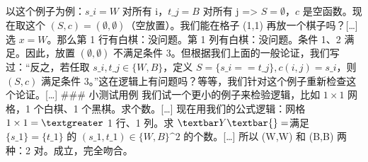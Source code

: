 以这个例子为例：$s\_i=W$ 对所有 i，$t\_j=B$ 对所有 j =\textgreater{} $S=\emptyset$，$c$ 是空函数。现在取这个 $(S,c)=(\emptyset, \emptyset)$（空放置）。我们能在格子 (1,1) 再放一个棋子吗？{[}\ldots{]} 选 $x=W$。那么第 1 行有白棋：没问题。第 1 列有白棋：没问题。条件 1、2 满足。因此，放置 $(\emptyset, \emptyset)$ 不满足条件 3。但根据我们上面的一般论证，我们写过：``反之，若任取 $s\_i,t\_j \in \{W,B\}$，定义 $S=\{s\_i==t\_j\}, c(i,j)=s\_i$，则 $(S,c)$ 满足条件 3。''这在逻辑上有问题吗？等等，我们针对这个例子重新检查这个论证。{[}\ldots{]} \#\#\# 小测试用例 我们试一个更小的例子来检验逻辑，比如 $1\times 1$ 网格，1 个白棋、1 个黑棋。求个数。{[}\ldots{]} 现在用我们的公式逻辑：网格 $1\times 1 =\textgreater$ 1 行、1 列。求 $\textbar Y\textbar{} = $满足 $\{s\_1\} = \{t\_1\}$ 的 $(s\_1, t\_1) \in \{W,B\}\^{}2$ 的个数。{[}\ldots{]} 所以 (W,W) 和 (B,B) 两种：2 对。成立，完全吻合。
